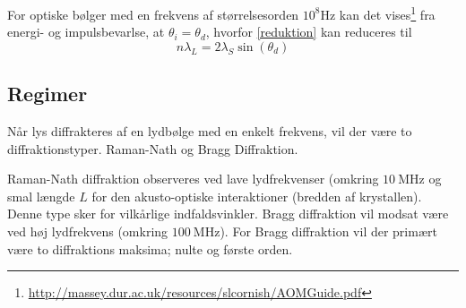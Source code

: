 \documentclass[main]{subfiles}
\begin{document}
For optiske bølger med en frekvens af størrelsesorden $10^8\si{\hertz}$ kan det vises\footnote{\url{http://massey.dur.ac.uk/resources/slcornish/AOMGuide.pdf}} fra energi- og impulsbevarlse, at $\theta_i = \theta_d$, hvorfor \cref{reduktion} kan reduceres til
\begin{equation}
    n\lambda_L = 2\lambda_S \sin(\theta_d)
    \label{eq:interferens}
\end{equation}
%
%
%
%
\subsection{Regimer}
Når lys diffrakteres af en lydbølge med en enkelt frekvens, vil der være to diffraktionstyper. Raman-Nath og Bragg Diffraktion.

Raman-Nath diffraktion observeres ved lave lydfrekvenser (omkring $\SI{10}{\mega\hertz}$ og smal længde $L$ for den akusto-optiske interaktioner (bredden af krystallen). Denne type sker for vilkårlige indfaldsvinkler.
Bragg diffraktion vil modsat være ved høj lydfrekvens (omkring $\SI{100}{\mega\hertz}$). For Bragg diffraktion vil der primært være to diffraktions maksima; nulte og første orden.
\end{document}
